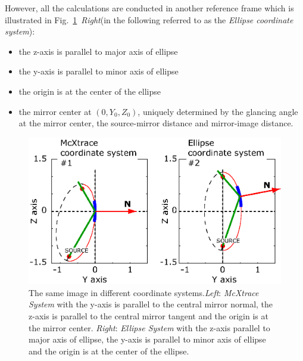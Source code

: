 However, all the calculations are conducted in another reference
frame which is illustrated in Fig.~\ref{fig:Ellipse}~\emph{Right}(in
the following referred to as the \emph{Ellipse coordinate system}):
\begin{itemize}
\item the z-axis is parallel to major axis of ellipse
\item the y-axis is parallel to minor axis of ellipse
\item the origin is at the center of the ellipse
\item the mirror center at $(0,Y_0,Z_0)$, uniquely determined by the
glancing angle at the mirror center, the source-mirror distance and
mirror-image distance.
\end{itemize}

\begin{figure}[htb!]
\centering
\includegraphics[width=0.95\linewidth]{figures/ellipse.eps}
 \caption{The same image in different coordinate systems.\newline \emph{Left}:
 \emph{McXtrace System} with the y-axis is parallel to the central mirror normal, the z-axis
 is parallel to the central mirror tangent and the origin is at the mirror
 center. \newline
 \emph{Right}: \emph{Ellipse System} with
the z-axis parallel to major axis of ellipse, the y-axis is parallel
to minor axis of ellipse and the origin is at the center of the
ellipse. }\label{fig:Ellipse}
\end{figure}


